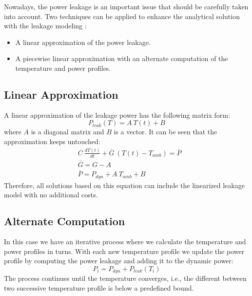   Nowadays, the power leakage is an important issue that should be carefully taken into account. Two techniques can be applied to enhance the analytical solution with the leakage modeling \cite{liu2007}:
  \begin{itemize}
    \item A linear approximation of the power leakage.
    \item A piecewise linear approximation with an alternate computation of the temperature and power profiles.
  \end{itemize}

\subsection{Linear Approximation}
A linear approximation of the leakage power has the following matrix form:
\[
  P_{leak}(T) = A \: T(t) + B
\]
where $A$ is a diagonal matrix and $B$ is a vector. It can be seen that the approximation keeps  untouched:
\begin{align*}
  & C \: \frac{dT(t)}{dt} + \bar{G} \: (T(t) - T_{amb}) = \bar{P} \\
  & \bar{G} = G - A \\
  & \bar{P} = P_{dyn} + A \: T_{amb} + B
\end{align*}
Therefore, all solutions based on this equation can include the linearized leakage model with no additional costs.

\subsection{Alternate Computation}
In this case we have an iterative process where we calculate the temperature and power profiles in turns. With each new temperature profile we update the power profile by computing the power leakage and adding it to the dynamic power:
\[
  P_i = P_{dyn} + P_{leak}(T_i)
\]
The process continues until the temperature converges, i.e., the different between two successive temperature profile is below a predefined bound.
